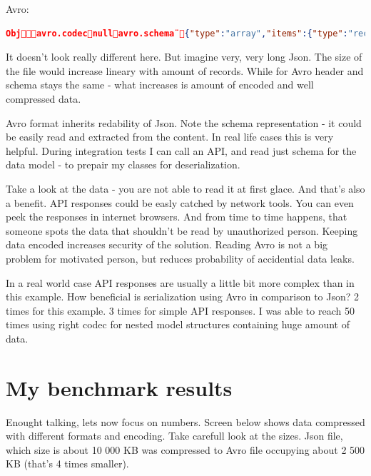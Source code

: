 \documentclass[]{article}
\begin{document}
Avro:
\begin{lstlisting}[language=json,firstnumber=1]
Objavro.codecnullavro.schema¨{"type":"array","items":{"type":"record","name":"Dataset","fields":[{"name":"minPosition","type":"int"},{"name":"hasMoreItems","type":"boolean"},{"name":"itemsHtml","type":["null","string"]},{"name":"newLatentCount","type":"int"},{"name":"itemIds","type":{"type":"array","items":"int"}},{"name":"isAvailable","type":"boolean"}]}} /Âźľ)|ř OČëHE řř\items_html6e64c2b9-dc87-4be3-b8ba-eca0da96ce78ŞÜVň  Ŕ\items_htmlaa233d3b-d6ea-41ff-b50f-f099c0c79991Ćx˛†   /Âźľ)|ř OČëHE
\end{lstlisting}

It doesn't look really different here. But imagine very, very long Json. The size of the file would increase lineary with amount of records. While for Avro header and schema stays the same - what increases is amount of encoded and well compressed data.

Avro format inherits redability of Json. Note the schema representation - it could be easily read and extracted from the content. In real life cases this is very helpful. During integration tests I can call an API, and read just schema for the data model - to prepair my classes for deserialization.

Take a look at the data - you are not able to read it at first glace. And that's also a benefit. API responses could be easly catched by network tools. You can even peek the responses in internet browsers. And from time to time happens, that someone spots the data that shouldn't be read by unauthorized person. Keeping data encoded increases security of the solution. Reading Avro is not a big problem for motivated person, but reduces probability of accidential data leaks.

In a real world case API responses are usually a little bit more complex than in this example. How beneficial is serialization using Avro in comparison to Json? 2 times for this example. 3 times for simple API responses. I was able to reach 50 times using right codec for nested model structures containing huge amount of data.

\section{My benchmark results}

Enought talking, lets now focus on numbers. Screen below shows data compressed with different formats and encoding. Take carefull look at the sizes. Json file, which size is about 10 000 KB was compressed to Avro file occupying about 2 500 KB (that's 4 times smaller). 
\end{document}
